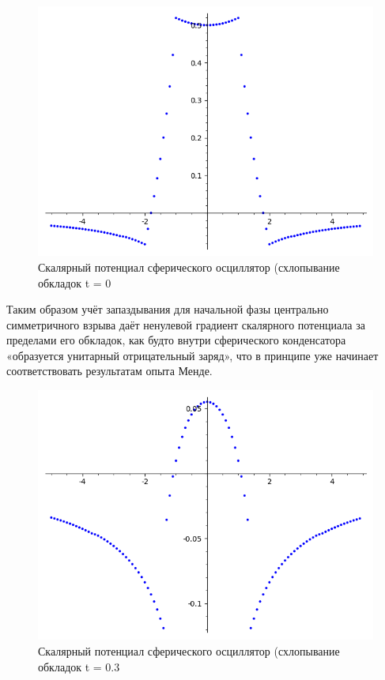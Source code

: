 ﻿\documentclass[12pt, letterpaper]{article}
\begin{document}
\begin{figure}
    \centering
    \includegraphics[scale=0.3]{spherical_oscillator_phi_Rneg=2_Rpos= 1_v0neg=-2_v0pos=1_a0neg=0_a0pos=0c=3_t=0}
    \caption{Скалярный потенциал сферического осциллятор (схлопывание обкладок t = 0}
    \label{fig:spherical_oscillator_phi_Rneg=2_Rpos= 1_v0neg=-2_v0pos=1_a0neg=0_a0pos=0c=3_t=0}
\end{figure}

Таким образом учёт запаздывания для начальной фазы центрально симметричного взрыва даёт ненулевой градиент скалярного потенциала за пределами его обкладок, как будто внутри сферического конденсатора «образуется унитарный отрицательный заряд», что в принципе уже начинает соответствовать результатам опыта Менде.

\begin{figure}
    \centering
    \includegraphics[scale=0.3]{spherical_oscillator_phi_Rneg=2_Rpos= 1_v0neg=-2_v0pos=1_a0neg=0_a0pos=0c=3_t=0.3}
    \caption{Скалярный потенциал сферического осциллятор (схлопывание обкладок t = 0.3}
    \label{fig:spherical_oscillator_phi_Rneg=2_Rpos= 1_v0neg=-2_v0pos=1_a0neg=0_a0pos=0c=3_t=0.3}
\end{figure}
\end{document}
